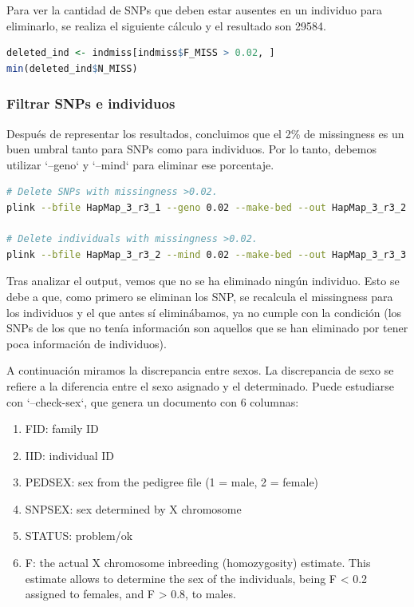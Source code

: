 Para ver la cantidad de SNPs que deben estar ausentes en un individuo para eliminarlo, se realiza el siguiente cálculo y el resultado son 29584.
\begin{lstlisting}[language=R]
deleted_ind <- indmiss[indmiss$F_MISS > 0.02, ]
min(deleted_ind$N_MISS)
\end{lstlisting}

\subsubsection{Filtrar SNPs e individuos}
Después de representar los resultados, concluimos que el 2\% de missingness es un buen umbral tanto para SNPs como para individuos. Por lo tanto, debemos utilizar `--geno` y `--mind` para eliminar ese porcentaje.

\begin{lstlisting}[language=bash]
# Delete SNPs with missingness >0.02.
plink --bfile HapMap_3_r3_1 --geno 0.02 --make-bed --out HapMap_3_r3_2

# Delete individuals with missingness >0.02.
plink --bfile HapMap_3_r3_2 --mind 0.02 --make-bed --out HapMap_3_r3_3
\end{lstlisting}

Tras analizar el output, vemos que no se ha eliminado ningún individuo. Esto se debe a que, como primero se eliminan los SNP, se recalcula el missingness para los individuos y el que antes sí eliminábamos, ya no cumple con la condición (los SNPs de los que no tenía información son aquellos que se han eliminado por tener poca información de individuos).

A continuación miramos la discrepancia entre sexos. La discrepancia de sexo se refiere a la diferencia entre el sexo asignado y el determinado. Puede estudiarse con `--check-sex`, que genera un documento con 6 columnas:
\begin{enumerate}
\item FID: family ID
\item IID: individual ID
\item PEDSEX: sex from the pedigree file (1 = male, 2 = female)
\item SNPSEX: sex determined by X chromosome
\item STATUS: problem/ok
\item F: the actual X chromosome inbreeding (homozygosity) estimate. This estimate allows to determine the sex of the individuals, being F < 0.2 assigned to females, and F > 0.8, to males.
\end{enumerate}

